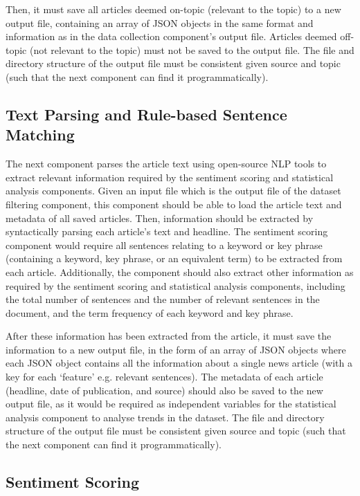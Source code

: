 \documentclass{report}
\begin{document}
Then, it must save all articles deemed on-topic (relevant to the topic) to a new output file, containing an array of JSON objects in the same format and information as in the data collection component's output file.
Articles deemed off-topic (not relevant to the topic) must not be saved to the output file.
The file and directory structure of the output file must be consistent given source and topic (such that the next component can find it programmatically).

\subsection{Text Parsing and Rule-based Sentence Matching} \label{req-matching}

The next component parses the article text using open-source NLP tools to extract relevant information required by the sentiment scoring and statistical analysis components.
Given an input file which is the output file of the dataset filtering component, this component should be able to load the article text and metadata of all saved articles.
Then, information should be extracted by syntactically parsing each article's text and headline.
The sentiment scoring component would require all sentences relating to a keyword or key phrase (containing a keyword, key phrase, or an equivalent term) to be extracted from each article.
Additionally, the component should also extract other information as required by the sentiment scoring and statistical analysis components, including the total number of sentences and the number of relevant sentences in the document, and the term frequency of each keyword and key phrase.

After these information has been extracted from the article, it must save the information to a new output file, in the form of an array of JSON objects where each JSON object contains all the information about a single news article (with a key for each `feature' e.g. relevant sentences).
The metadata of each article (headline, date of publication, and source) should also be saved to the new output file, as it would be required as independent variables for the statistical analysis component to analyse trends in the dataset.
The file and directory structure of the output file must be consistent given source and topic (such that the next component can find it programmatically).

\subsection{Sentiment Scoring} \label{req-sentiment}
\end{document}
